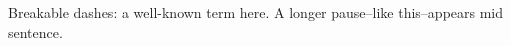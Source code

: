 \documentclass{article}
\begin{document}
Breakable dashes: a well\--known term here.
A longer pause\---like this\---appears mid sentence.
\end{document}
